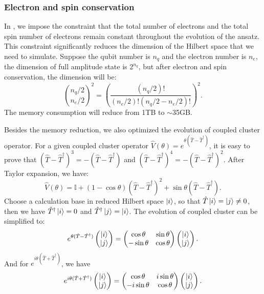 \subsubsection{Electron and spin conservation}
In \QuPack, we impose the constraint that the total number of electrons and the total spin number of electrons remain constant throughout the evolution of the ansatz. This constraint significantly reduces the dimension of the Hilbert space that we need to simulate. Suppose the qubit number is $n_q$ and the electron number is $n_e$, the dimension of full amplitude state is $2^{n_q}$, but after electron and spin conservation, the dimension will be:
\begin{equation}
    \binom{n_q/2}{n_e/2}^2=\left(\frac{(n_q/2)!}{(n_e/2)!(n_q/2-n_e/2)!}\right)^2.
\end{equation}
The memory consumption will reduce from 1TB to $\sim$35GB.

Besides the memory reduction, we also optimized the evolution of coupled cluster operator. For a given coupled cluster operator $\hat{V}(\theta)=e^{\theta(\hat{T}-\hat{T}^\dagger)}$, it is easy to prove that $(\hat{T}-\hat{T}^\dagger)^3 = - (\hat{T}-\hat{T}^\dagger)$ and $(\hat{T}-\hat{T}^\dagger)^4 = -(\hat{T}-\hat{T}^\dagger)^2$. After Taylor expansion, we have:
\begin{equation}
    \hat{V}(\theta) = \mathbb{I} + ( 1-\cos\theta)(\hat{T}-\hat{T}^\dagger)^2 + \sin\theta (\hat{T}-\hat{T}^\dagger).
\end{equation}
Choose a calculation base in reduced Hilbert space $\ket{i}$, so that $\hat{T}\ket{i} = \ket{j}\neq0$, then we have $\hat{T}^\dagger\ket{i}=0$ and $\hat{T}^\dagger\ket{j}=\ket{i}$. The evolution of coupled cluster can be simplified to:
\begin{equation}
    e^{\theta(\hat{T}-\hat{T}^\dagger)}\begin{pmatrix}
        \ket{i} \\\ket{j}
    \end{pmatrix}=\begin{pmatrix}
        \cos\theta  & \sin\theta \\
        -\sin\theta & \cos\theta
    \end{pmatrix}\begin{pmatrix}
        \ket{i} \\\ket{j}
    \end{pmatrix}.
\end{equation}
And for $e^{i\theta(\hat{T}+\hat{T}^\dagger)}$, we have
\begin{equation}
    e^{i\theta(\hat{T}+\hat{T}^\dagger)}\begin{pmatrix}
        \ket{i} \\\ket{j}
    \end{pmatrix}=\begin{pmatrix}
        \cos\theta   & i\sin\theta \\
        -i\sin\theta & \cos\theta
    \end{pmatrix}\begin{pmatrix}
        \ket{i} \\\ket{j}
    \end{pmatrix}.
\end{equation}

